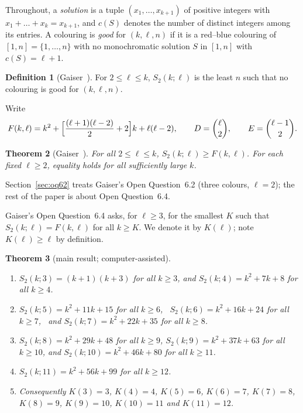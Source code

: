 \documentclass[11pt]{amsart}
\newtheorem{theorem}{Theorem}
\theoremstyle{definition}
\newtheorem{definition}[theorem]{Definition}
\newcommand{\F}{F}
\newcommand{\Stwo}{S_2}
\begin{document}
Throughout, a \emph{solution} is a tuple $(x_1,\dots,x_{k+1})$ of positive integers with $x_1+\dots+x_k=x_{k+1}$, and $c(S)$ denotes the number of distinct integers among its entries. A colouring is \emph{good} for $(k,\ell,n)$ if it is a red--blue colouring of $[1,n]=\{1,\dots,n\}$ with no monochromatic solution $S$ in $[1,n]$ with $c(S)=\ell+1$.

\begin{definition}[Gaiser~\cite{Gaiser}]
For $2\le\ell\le k$, $\Stwo(k;\ell)$ is the least $n$ such that no colouring is good for $(k,\ell,n)$.
\end{definition}

Write
\[
\F(k,\ell)=k^2+\Bigl[\frac{(\ell+1)(\ell-2)}{2}+2\Bigr]k+\ell(\ell-2),\qquad D=\binom{\ell}{2},\qquad E=\binom{\ell-1}{2}.
\]

\begin{theorem}[Gaiser~{\cite[Thm.~1.1]{Gaiser}}]\label{thm:gaiser}
For all $2\le\ell\le k$, $\Stwo(k;\ell)\ge\F(k,\ell)$. For each fixed $\ell\ge2$, equality holds for all sufficiently large $k$.
\end{theorem}

\noindent Section~\ref{sec:oq62} treats Gaiser's Open Question~6.2 (three colours, $\ell=2$); the rest of the paper is about Open Question~6.4.

\noindent Gaiser's Open Question~6.4 asks, for $\ell\ge3$, for the smallest $K$ such that $\Stwo(k;\ell)=\F(k,\ell)$ for all $k\ge K$. We denote it by $K(\ell)$; note $K(\ell)\ge\ell$ by definition.

\begin{theorem}[main result; computer-assisted]\label{thm:main}
\begin{enumerate}[label=(\alph*)]
\item $\Stwo(k;3)=(k+1)(k+3)$ for all $k\ge3$, and $\Stwo(k;4)=k^2+7k+8$ for all $k\ge4$.
\item $\Stwo(k;5)=k^2+11k+15$ for all $k\ge6$, \ $\Stwo(k;6)=k^2+16k+24$ for all $k\ge7$, \ and $\Stwo(k;7)=k^2+22k+35$ for all $k\ge8$.
\item $\Stwo(k;8)=k^2+29k+48$ for all $k\ge9$, $\Stwo(k;9)=k^2+37k+63$ for all $k\ge10$, and $\Stwo(k;10)=k^2+46k+80$ for all $k\ge11$.
\item $\Stwo(k;11)=k^2+56k+99$ for all $k\ge12$.
\item Consequently $K(3)=3$, $K(4)=4$, $K(5)=6$, $K(6)=7$, $K(7)=8$, $K(8)=9$, $K(9)=10$, $K(10)=11$ and $K(11)=12$.
\end{enumerate}
\end{theorem}
\end{document}
